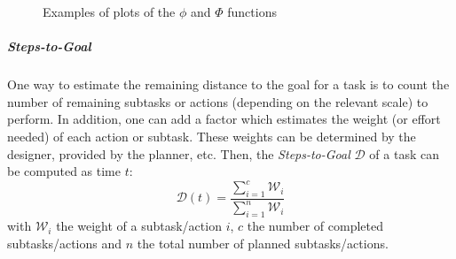 \documentclass[a4paper,11pt,twoside]{StyleThese}
\begin{document}
\begin{figure}[!htb]
	\centering
	\hfill
	\hfill
	\hfill
	\caption{Examples of plots of the $\phi$ and $\Phi$ functions}
	\label{fig:ote}
\end{figure}

\subparagraph{Steps-to-Goal}
One way to estimate the remaining distance to the goal for a task is to count the number of remaining subtasks or actions (depending on the relevant scale) to perform. In addition, one can add a factor which estimates the weight (or effort needed) of each action or subtask. These weights can be determined by the designer, provided by the planner, etc. 
Then, the \textit{Steps-to-Goal} $\mathcal{D}$  of a task can be computed as time $t$:
\begin{equation}\label{eq:edtgs}
\mathcal{D}(t) = \dfrac{\sum\limits_{i=1}^c \mathcal{W}_i}{\sum\limits_{i=1}^n \mathcal{W}_i}
\end{equation}
with $\mathcal{W}_i$ the weight of a subtask/action $i$, $c$ the number of completed subtasks/actions and $n$ the total number of planned subtasks/actions.
\end{document}
